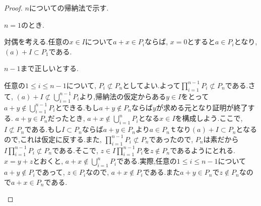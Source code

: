 \begin{proof}
	$n$についての帰納法で示す.
	
	\begin{step}
		\item $n=1$のとき.
		
		対偶を考える.任意の$x\in I$について$a+x\in P_i$ならば, $x=0$とすると$a\in P_i$となり, $(a)+I\subset P_1$である.
		
		\item $n-1$まで正しいとする.
		
		任意の$1\leq i\leq n-1$について, $P_i\not\subset P_n$としてよい.よって$\prod_{i=1}^{n-1}P_i\not\subset P_n$である.さて, $(a)+I\not\subset\bigcup_{i=1}^{n-1}P_i$より,帰納法の仮定からある$y\in I$をとって$a+y\not\in\bigcup_{i=1}^{n-1}P_i$とできる.もし$a+y\not\in P_n$ならば$y$が求める元となり証明が終了する. $a+y\in P_n$だったとき, $a+x\not\in \bigcup_{i=1}^n P_i$となる$x\in I$を構成しよう.ここで, $I\not\subset P_n$である.もし$I\subset P_n$ならば$a+y\in P_n$より$a\in P_n$ｔなり$(a)+I\subset P_n$となるので,これは仮定に反する.また, $\prod_{i=1}^{n-1}P_i\not\subset P_n$であったので, $P_n$は素だから$I\prod_{i=1}^{n-1}P_i\not\subset P_n$である.そこで, $z\in I\prod_{i=1}^{n-1}P_i$を$z\not\in P_n$であるようにとれる. $x=y+z$とおくと, $a+x\not\in\bigcup_{i=1}^n P_i$である.実際,任意の$1\leq i\leq n-1$について$a+y\not\in P_i$であって, $z\in P_i$なので, $a+x\not\in P_i$である.また$a+y\in P_n$で$z\not\in P_n$なので$a+x\in P_n$である.	
	\end{step}
\end{proof}